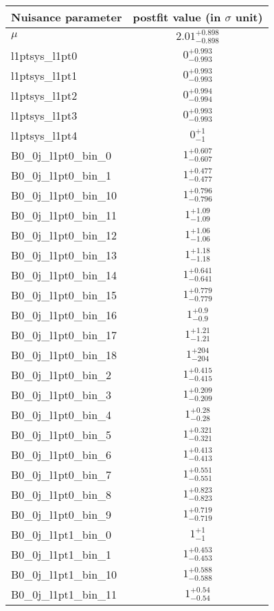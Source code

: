 
\begin{tabular}{|l|c|}
\hline
Nuisance parameter & postfit value (in $\sigma$ unit) \\\hline
$\mu$ & $2.01^{+0.898}_{-0.898}$ \\
l1ptsys\_l1pt0 & $0^{+0.993}_{-0.993}$ \\
l1ptsys\_l1pt1 & $0^{+0.993}_{-0.993}$ \\
l1ptsys\_l1pt2 & $0^{+0.994}_{-0.994}$ \\
l1ptsys\_l1pt3 & $0^{+0.993}_{-0.993}$ \\
l1ptsys\_l1pt4 & $0^{+1}_{-1}$ \\
B0\_0j\_l1pt0\_bin\_0 & $1^{+0.607}_{-0.607}$ \\
B0\_0j\_l1pt0\_bin\_1 & $1^{+0.477}_{-0.477}$ \\
B0\_0j\_l1pt0\_bin\_10 & $1^{+0.796}_{-0.796}$ \\
B0\_0j\_l1pt0\_bin\_11 & $1^{+1.09}_{-1.09}$ \\
B0\_0j\_l1pt0\_bin\_12 & $1^{+1.06}_{-1.06}$ \\
B0\_0j\_l1pt0\_bin\_13 & $1^{+1.18}_{-1.18}$ \\
B0\_0j\_l1pt0\_bin\_14 & $1^{+0.641}_{-0.641}$ \\
B0\_0j\_l1pt0\_bin\_15 & $1^{+0.779}_{-0.779}$ \\
B0\_0j\_l1pt0\_bin\_16 & $1^{+0.9}_{-0.9}$ \\
B0\_0j\_l1pt0\_bin\_17 & $1^{+1.21}_{-1.21}$ \\
B0\_0j\_l1pt0\_bin\_18 & $1^{+204}_{-204}$ \\
B0\_0j\_l1pt0\_bin\_2 & $1^{+0.415}_{-0.415}$ \\
B0\_0j\_l1pt0\_bin\_3 & $1^{+0.209}_{-0.209}$ \\
B0\_0j\_l1pt0\_bin\_4 & $1^{+0.28}_{-0.28}$ \\
B0\_0j\_l1pt0\_bin\_5 & $1^{+0.321}_{-0.321}$ \\
B0\_0j\_l1pt0\_bin\_6 & $1^{+0.413}_{-0.413}$ \\
B0\_0j\_l1pt0\_bin\_7 & $1^{+0.551}_{-0.551}$ \\
B0\_0j\_l1pt0\_bin\_8 & $1^{+0.823}_{-0.823}$ \\
B0\_0j\_l1pt0\_bin\_9 & $1^{+0.719}_{-0.719}$ \\
B0\_0j\_l1pt1\_bin\_0 & $1^{+1}_{-1}$ \\
B0\_0j\_l1pt1\_bin\_1 & $1^{+0.453}_{-0.453}$ \\
B0\_0j\_l1pt1\_bin\_10 & $1^{+0.588}_{-0.588}$ \\
B0\_0j\_l1pt1\_bin\_11 & $1^{+0.54}_{-0.54}$ \\

\end{tabular}
